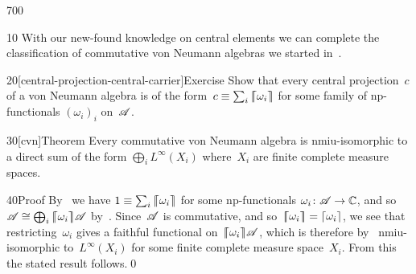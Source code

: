 \begin{parsec}{700}%
\begin{point}{10}%
With our new-found knowledge on central elements
we can complete the classification
of commutative von Neumann algebras
we started in~.
\end{point}
\begin{point}{20}[central-projection-central-carrier]{Exercise}%
Show that every central projection~$c$
of a von Neumann algebra is of
the form~$c\equiv \sum_i \left\lceil\!\!\left\lceil\omega_i\right\rceil\!\!\right\rceil$
for some family of np-functionals $(\omega_i)_i$ on~$\mathscr{A}$.
\end{point}
\begin{point}{30}[cvn]{Theorem}%
Every commutative von Neumann algebra
is nmiu-isomorphic
to a direct sum of the form  $\bigoplus_i L^\infty(X_i)$
where~$X_i$ are finite complete measure spaces.
\begin{point}{40}{Proof}%
By~
we have $1\equiv \sum_i \left\lceil\!\!\left\lceil\omega_i\right\rceil\!\!\right\rceil $
for some np-functionals $\omega_i\colon \mathscr{A}\to\mathbb{C}$,
and so~$\mathscr{A}\cong \bigoplus_i \left\lceil\!\!\left\lceil\omega_i\right\rceil\!\!\right\rceil\!\mathscr{A}$
by~.
Since~$\mathscr{A}$ is commutative,
and so~$\left\lceil\!\!\left\lceil\omega_i\right\rceil\!\!\right\rceil=\left\lceil\omega_i\right\rceil$,
we see that restricting~$\omega_i$
gives a faithful functional on~$\left\lceil\!\!\left\lceil\omega_i\right\rceil\!\!\right\rceil\!\mathscr{A}$,
which is therefore by~ nmiu-isomorphic to~$L^\infty(X_i)$
for some finite complete measure space~$X_i$.
From this the stated result follows.\qed
\end{point}
\end{point}
\end{parsec}

